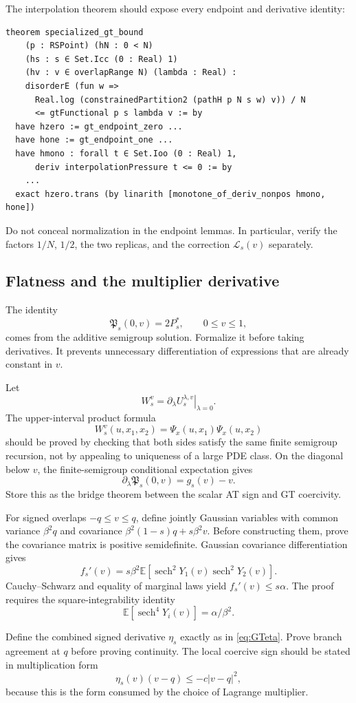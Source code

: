 \documentclass[11pt]{article}
\numberwithin{equation}{section}
\newcommand{\E}{\mathbb{E}}
\newcommand{\1}{\mathbf 1}
\begin{document}
The interpolation theorem should expose every endpoint and derivative
identity:
\begin{lstlisting}
theorem specialized_gt_bound
    (p : RSPoint) (hN : 0 < N)
    (hs : s ∈ Set.Icc (0 : Real) 1)
    (hv : v ∈ overlapRange N) (lambda : Real) :
    disorderE (fun w =>
      Real.log (constrainedPartition2 (pathH p N s w) v)) / N
      <= gtFunctional p s lambda v := by
  have hzero := gt_endpoint_zero ...
  have hone := gt_endpoint_one ...
  have hmono : forall t ∈ Set.Ioo (0 : Real) 1,
      deriv interpolationPressure t <= 0 := by
    ...
  exact hzero.trans (by linarith [monotone_of_deriv_nonpos hmono, hone])
\end{lstlisting}
Do not conceal normalization in the endpoint lemmas.  In particular, verify
the factors $1/N$, $1/2$, the two replicas, and the correction
$\mathcal L_s(v)$ separately.

\subsection{Flatness and the multiplier derivative}

The identity
\[
 \mathfrak P_s(0,v)=2P_s^*,\qquad 0\le v\le1,
\]
comes from the additive semigroup solution.  Formalize it before taking
derivatives.  It prevents unnecessary differentiation of expressions that
are already constant in $v$.

Let
\[
 W_s^v=\left.\partial_\lambda U_s^{\lambda,v}\right|_{\lambda=0}.
\]
The upper-interval product formula
\[
 W_s^v(u,x_1,x_2)=\Psi_x(u,x_1)\Psi_x(u,x_2)
\]
should be proved by checking that both sides satisfy the same finite
semigroup recursion, not by appealing to uniqueness of a large PDE class.
On the diagonal below $v$, the finite-semigroup conditional expectation
gives
\[
 \partial_\lambda\mathfrak P_s(0,v)=g_s(v)-v.
\]
Store this as the bridge theorem between the scalar AT sign and GT
coercivity.

For signed overlaps $-q\le v\le q$, define jointly Gaussian variables with
common variance $\beta^2q$ and covariance
$\beta^2(1-s)q+s\beta^2v$.  Before constructing them, prove the covariance
matrix is positive semidefinite.  Gaussian covariance differentiation gives
\[
 f_s'(v)=s\beta^2\E[
 \operatorname{sech}^2Y_1(v)\operatorname{sech}^2Y_2(v)].
\]
Cauchy--Schwarz and equality of marginal laws yield $f_s'(v)\le s\alpha$.
The proof requires the square-integrability identity
\[
 \E[\operatorname{sech}^4Y_i(v)]=\alpha/\beta^2.
\]

Define the combined signed derivative $\eta_s$ exactly as in
\eqref{eq:GTeta}.  Prove branch agreement at $q$ before proving continuity.
The local coercive sign should be stated in multiplication form
\[
 \eta_s(v)(v-q)\le-c|v-q|^2,
\]
because this is the form consumed by the choice of Lagrange multiplier.
\end{document}
